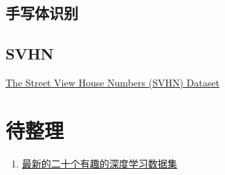 \subsection{手写体识别}

\subsection{SVHN}

\href{http://ufldl.stanford.edu/housenumbers/}{The Street View House Numbers (SVHN) Dataset}



\section{待整理}
\begin{enumerate}
  \item \href{https://blog.csdn.net/CoderPai/article/details/69662230}{最新的二十个有趣的深度学习数据集}
\end{enumerate}

\ifx\projectsnotes\undefined
    
\fi
